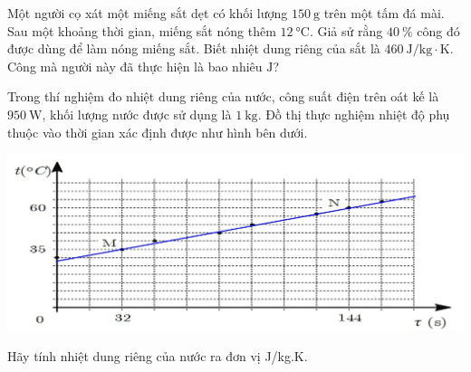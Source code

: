 \begin{ex}
	Một người cọ xát một miếng sắt dẹt có khối lượng $\SI{150}{\gram}$ trên một tấm đá mài. Sau một khoảng thời gian, miếng sắt nóng thêm $\SI{12}{\celsius}$. Giả sử rằng $\SI{40}{\percent}$ công đó được dùng để làm nóng miếng sắt. Biết nhiệt dung riêng của sắt là $\SI{460}{\joule/\kilogram\cdot\kelvin}$. Công mà người này đã thực hiện là bao nhiêu $\si{\joule}$?
\end{ex}
\begin{ex}
Trong thí nghiệm đo nhiệt dung riêng của nước, công suất điện trên oát kế là $\SI{950}{\watt}$, khối lượng nước được sử dụng là $\SI{1}{\kilogram}$. Đồ thị thực nghiệm nhiệt độ phụ thuộc vào thời gian xác định được như hình bên dưới.
\begin{center}
	\includegraphics[width=0.7\linewidth]{../figs/Y24-VN12-PH-C1-BT-2}
\end{center}	
Hãy tính nhiệt dung riêng của nước ra đơn vị J/kg.K.
\end{ex}
